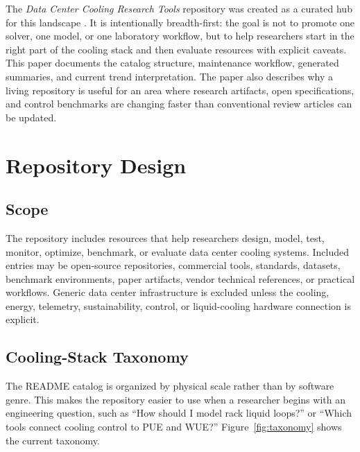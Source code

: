 \documentclass[11pt]{article}
\begin{document}
The \emph{Data Center Cooling Research Tools} repository was created as a curated hub for this landscape \cite{DCCRT2026}. It is intentionally breadth-first: the goal is not to promote one solver, one model, or one laboratory workflow, but to help researchers start in the right part of the cooling stack and then evaluate resources with explicit caveats. This paper documents the catalog structure, maintenance workflow, generated summaries, and current trend interpretation. The paper also describes why a living repository is useful for an area where research artifacts, open specifications, and control benchmarks are changing faster than conventional review articles can be updated.

\section{Repository Design}

\subsection{Scope}

The repository includes resources that help researchers design, model, test, monitor, optimize, benchmark, or evaluate data center cooling systems. Included entries may be open-source repositories, commercial tools, standards, datasets, benchmark environments, paper artifacts, vendor technical references, or practical workflows. Generic data center infrastructure is excluded unless the cooling, energy, telemetry, sustainability, control, or liquid-cooling hardware connection is explicit.

\subsection{Cooling-Stack Taxonomy}

The README catalog is organized by physical scale rather than by software genre. This makes the repository easier to use when a researcher begins with an engineering question, such as ``How should I model rack liquid loops?'' or ``Which tools connect cooling control to PUE and WUE?'' Figure~\ref{fig:taxonomy} shows the current taxonomy.
\end{document}
